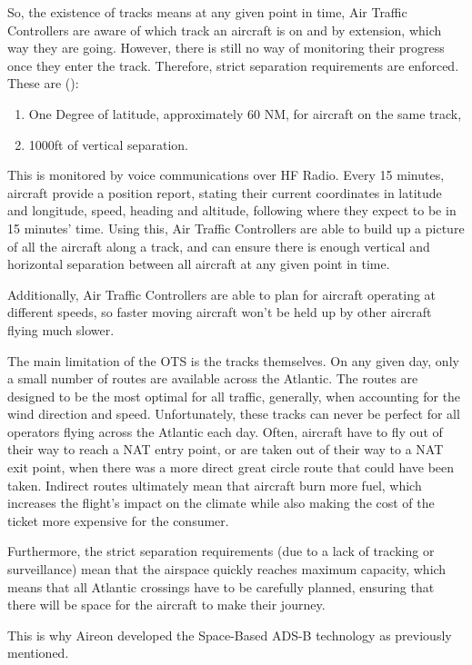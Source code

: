 \documentclass[stu, a4paper, 12pt, floatsintext]{apa7}
\numberwithin{figure}{section}
\numberwithin{table}{section}
\numberwithin{equation}{section}
\begin{document}
So, the existence of tracks means at any given point in time, Air Traffic Controllers are aware of which track an aircraft is on and by extension, which way they are going. However, there is still no way of monitoring their progress once they enter the track. Therefore, strict separation requirements are enforced. These are (\cite{SKYbrary}):
\begin{enumerate}
    \item One Degree of latitude, approximately 60 NM, for aircraft on the same track,
    \item 1000ft of vertical separation.
\end{enumerate}

This is monitored by voice communications over HF Radio. Every 15 minutes, aircraft provide a position report, stating their current coordinates in latitude and longitude, speed, heading and altitude, following where they expect to be in 15 minutes' time. Using this, Air Traffic Controllers are able to build up a picture of all the aircraft along a track, and can ensure there is enough vertical and horizontal separation between all aircraft at any given point in time.

Additionally, Air Traffic Controllers are able to plan for aircraft operating at different speeds, so faster moving aircraft won’t be held up by other aircraft flying much slower.

The main limitation of the OTS is the tracks themselves. On any given day, only a small number of routes are available across the Atlantic. The routes are designed to be the most optimal for all traffic, generally, when accounting for the wind direction and speed. Unfortunately, these tracks can never be perfect for all operators flying across the Atlantic each day. Often, aircraft have to fly out of their way to reach a NAT entry point, or are taken out of their way to a NAT exit point, when there was a more direct great circle route that could have been taken. Indirect routes ultimately mean that aircraft burn more fuel, which increases the flight’s impact on the climate while also making the cost of the ticket more expensive for the consumer. 

Furthermore, the strict separation requirements (due to a lack of tracking or surveillance) mean that the airspace quickly reaches maximum capacity, which means that all Atlantic crossings have to be carefully planned, ensuring that there will be space for the aircraft to make their journey. 

This is why Aireon developed the Space-Based ADS-B technology as previously mentioned. 
\end{document}
